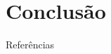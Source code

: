 \section{Conclusão} %

\begin{frame}{Referências}
    \nocite{*}
    \printbibliography[heading=none]
\end{frame}
